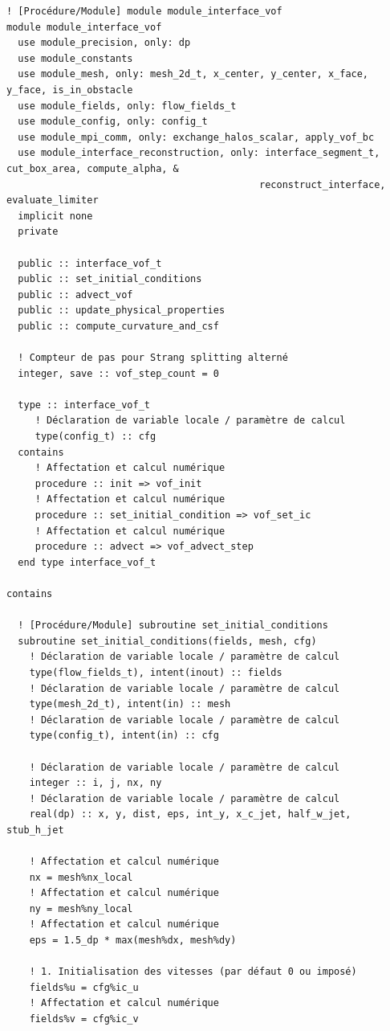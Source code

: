 \documentclass[10pt,a4paper,oneside]{book}
\begin{document}
\begin{lstlisting}[language={[95]Fortran}]
! [Procédure/Module] module module_interface_vof
module module_interface_vof
  use module_precision, only: dp
  use module_constants
  use module_mesh, only: mesh_2d_t, x_center, y_center, x_face, y_face, is_in_obstacle
  use module_fields, only: flow_fields_t
  use module_config, only: config_t
  use module_mpi_comm, only: exchange_halos_scalar, apply_vof_bc
  use module_interface_reconstruction, only: interface_segment_t, cut_box_area, compute_alpha, &
                                            reconstruct_interface, evaluate_limiter
  implicit none
  private

  public :: interface_vof_t
  public :: set_initial_conditions
  public :: advect_vof
  public :: update_physical_properties
  public :: compute_curvature_and_csf

  ! Compteur de pas pour Strang splitting alterné
  integer, save :: vof_step_count = 0

  type :: interface_vof_t
     ! Déclaration de variable locale / paramètre de calcul
     type(config_t) :: cfg
  contains
     ! Affectation et calcul numérique
     procedure :: init => vof_init
     ! Affectation et calcul numérique
     procedure :: set_initial_condition => vof_set_ic
     ! Affectation et calcul numérique
     procedure :: advect => vof_advect_step
  end type interface_vof_t

contains

  ! [Procédure/Module] subroutine set_initial_conditions
  subroutine set_initial_conditions(fields, mesh, cfg)
    ! Déclaration de variable locale / paramètre de calcul
    type(flow_fields_t), intent(inout) :: fields
    ! Déclaration de variable locale / paramètre de calcul
    type(mesh_2d_t), intent(in) :: mesh
    ! Déclaration de variable locale / paramètre de calcul
    type(config_t), intent(in) :: cfg

    ! Déclaration de variable locale / paramètre de calcul
    integer :: i, j, nx, ny
    ! Déclaration de variable locale / paramètre de calcul
    real(dp) :: x, y, dist, eps, int_y, x_c_jet, half_w_jet, stub_h_jet

    ! Affectation et calcul numérique
    nx = mesh%nx_local
    ! Affectation et calcul numérique
    ny = mesh%ny_local
    ! Affectation et calcul numérique
    eps = 1.5_dp * max(mesh%dx, mesh%dy)

    ! 1. Initialisation des vitesses (par défaut 0 ou imposé)
    fields%u = cfg%ic_u
    ! Affectation et calcul numérique
    fields%v = cfg%ic_v


\end{lstlisting}
\end{document}
